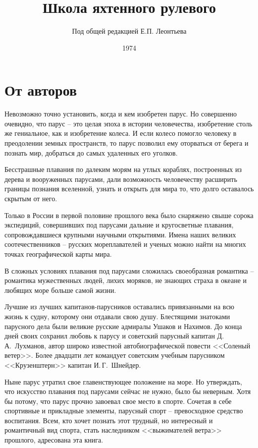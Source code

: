 \documentclass[a4paper, 12pt, twoside, final]{scrbook}
\begin{document}
\frontmatter

\author{Под общей редакцией Е.П. Леонтьева}
\title{Школа яхтенного рулевого}
\date{1974}
\maketitle


\tableofcontents
\listoffigures
\listoftables

\chapter{От авторов}

Невозможно точно установить, когда и кем изобретен парус. Но совершенно очевидно, что парус \--- это целая эпоха в истории человечества, изобретение столь же гениальное, как и изобретение колеса. И если колесо помогло человеку в преодолении земных пространств, то парус позволил ему оторваться от берега и познать мир, добраться до самых удаленных его уголков.

Бесстрашные плавания по далеким морям на утлых кораблях, построенных из дерева и вооруженных парусами, дали возможность человечеству расширить границы познания вселенной, узнать и открыть для мира то, что долго оставалось скрытым от него.

Только в России в первой половине прошлого века было снаряжено свыше сорока экспедиций, совершивших под парусами дальние и кругосветные плавания, сопровождавшиеся крупными научными открытиями. Имена наших великих соотечественников \--- русских мореплавателей и ученых можно найти на многих точках географической карты мира.

В сложных условиях плавания под парусами сложилась своеобразная романтика \--- романтика мужественных людей, лихих моряков, не знающих страха в океане и любящих море больше самой жизни. 

Лучшие из лучших капитанов-парусников оставались привязанными на всю
жизнь к судну, которому они отдавали свою душу. Блестящими знатоками парусного дела были великие русские адмиралы Ушаков и Нахимов. До конца дней своих сохранил любовь к парусу и советский парусный капитан Д.\,А.~Лухманов, автор широко известной автобиографической повести <<Соленый ветер>>.
Более двадцати лет командует советским учебным парусником <<Крузенштерн>> капитан И.\,Г.~Шнейдер.

Ныне парус утратил свое главенствующее положение на море. Но утверждать, что искусство плавания под парусами сейчас не нужно, было бы неверным. Хотя бы потому, что парус прочно завоевал свое место в спорте. Сочетая в себе спортивные и прикладные элементы, парусный спорт \--- превосходное средство воспитания. Всем, кто хочет познать этот трудный, но интересный и романтичный вид спорта, стать наследником <<выжимателей ветра>> прошлого, адресована эта книга. 
\end{document}
